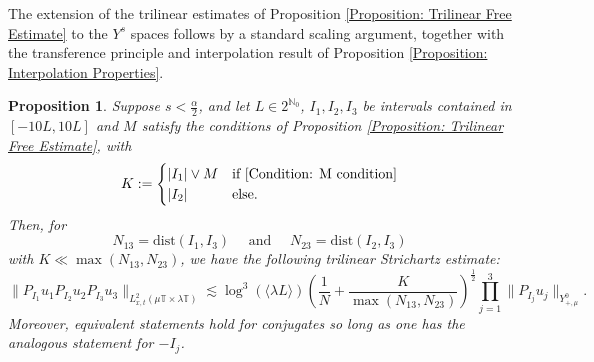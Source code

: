 \documentclass[12pt, letterpaper]{amsart}
\newtheorem{proposition}{Proposition}
\begin{document}
The extension of the trilinear estimates of Proposition \ref{Proposition: Trilinear Free Estimate} to the $Y^s$ spaces follows by a standard scaling argument, together with the transference principle and interpolation result of Proposition \ref{Proposition: Interpolation Properties}.
\begin{proposition}\label{Lemma: trilinear Estimates}
    Suppose $s < \frac{\alpha}{2}$, and let $L\in 2^{\mathbb{N}_0}$, $I_1, I_2, I_3$ be intervals contained in $[-10L, 10L]$ and $M$ satisfy the conditions of Proposition \ref{Proposition: Trilinear Free Estimate}, with
    \[
    K := 
\begin{cases}
    |I_1|\vee M & \mbox{if }\eqref{Condition: M condition}\\
    |I_2| &\mbox{else}.
\end{cases}
    \]
    Then, for
    \[
    N_{13} = \mathrm{dist}(I_1, I_3)\quad\mbox{ and }\quad N_{23} = \mathrm{dist}(I_2, I_3)
    \]
    with $K\ll \max(N_{13}, N_{23})$, we have the following trilinear Strichartz estimate:
    \[
    \|P_{I_1}u_1P_{I_2}u_2P_{I_3}u_3\|_{L^2_{x,t}(\mu\mathbb{T}\times\lambda\mathbb{T})}\lesssim \log^3(\langle \lambda L\rangle)\left(\frac{1}{N}+\frac{K}{\max(N_{13}, N_{23})}\right)^\frac{1}{2}\prod_{j=1}^3\|P_{I_j}u_j\|_{Y^0_{+,\mu}}.
    \]
    Moreover, equivalent statements hold for conjugates so long as one has the analogous statement for $-I_j$.
\end{proposition}
\end{document}
